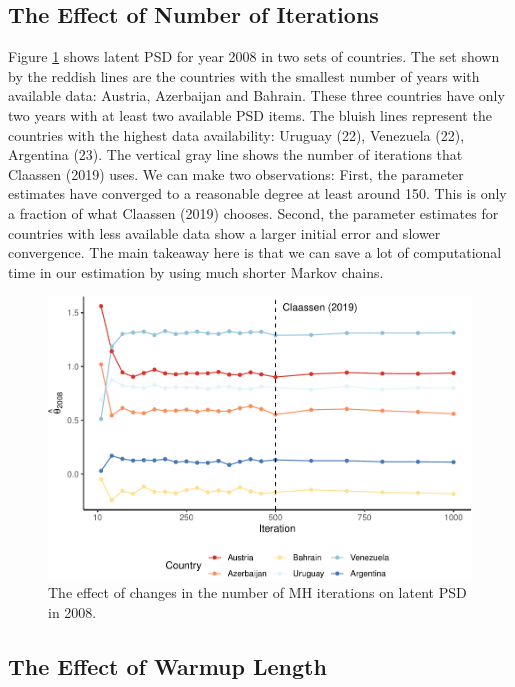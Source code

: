\documentclass[12pt,english,a4paper,oneside]{article}
\theoremstyle{definition}
\theoremstyle{definition}
\theoremstyle{definition}
\theoremstyle{definition}
\theoremstyle{remark}
\begin{document}
\hypertarget{the-effect-of-number-of-iterations}{%
\subsection{The Effect of Number of Iterations}\label{the-effect-of-number-of-iterations}}

Figure \ref{fig:niter} shows latent PSD for year 2008 in two sets of countries. The set shown by the reddish lines are the countries with the smallest number of years with available data: Austria, Azerbaijan and Bahrain. These three countries have only two years with at least two available PSD items. The bluish lines represent the countries with the highest data availability: Uruguay (22), Venezuela (22), Argentina (23). The vertical gray line shows the number of iterations that Claassen (2019) uses. We can make two observations: First, the parameter estimates have converged to a reasonable degree at least around 150. This is only a fraction of what Claassen (2019) chooses. Second, the parameter estimates for countries with less available data show a larger initial error and slower convergence. The main takeaway here is that we can save a lot of computational time in our estimation by using much shorter Markov chains.

\begin{figure}[H]
\includegraphics[width=\textwidth]{figs/niter-1} \caption[The effect of changes in the number of MH iterations on latent PSD in 2008]{The effect of changes in the number of MH iterations on latent PSD in 2008.}\label{fig:niter}
\end{figure}

\hypertarget{the-effect-of-warmup-length}{%
\subsection{The Effect of Warmup Length}\label{the-effect-of-warmup-length}}
\end{document}
